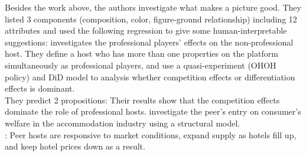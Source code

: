 \documentclass[10pt]{report}
\begin{document}
Besides the work above, the authors investigate what makes a picture good. They listed 3 components (composition, color, figure-ground relationship) including 12 attributes and used the
following regression to give some human-interpretable suggestions:
\cite{chen2023regulating} investigates the professional players' effects on the non-professional host. They define a host who has more than
one properties on the platform simultaneously as professional players, and use a quasi-experiment (OHOH policy) and DiD model to analysis
whether competition effects or differentiation effects is dominant.\\
They predict 2 propositions:
Their results show that the competition effects dominate the role of professional hosts.
\cite{farronato2022welfare} investigate the peer's entry on consumer's welfare in the accommodation industry using a structural model.\\
: Peer hosts are responsive to market conditions, expand supply as hotels fill up, and keep hotel prices down as a result.
\end{document}
